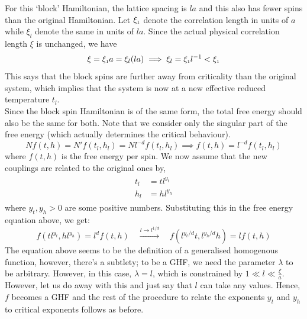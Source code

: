 For this `block' Hamiltonian, the lattice spacing is $la$ and this also has fewer spins than the original Hamiltonian. Let $\xi_{\text{\tiny 1}}$ denote the correlation length in units of $a$ while $\xi_l$ denote the same in units of $la$. Since the actual physical correlation length $\xi$ is unchanged, we have
\begin{align*}
    \xi = \xi_{\text{\tiny 1}}a = \xi_l (la) \implies \xi_l = \xi_{\text{\tiny 1}}l^{-1}< \xi_{\text{\tiny 1}}
\end{align*}
This says that the block spins are further away from criticality than the original system, which implies that the system is now at a new effective reduced temperature $t_l$. \\[0.2cm]
Since the block spin Hamiltonian is of the same form, the total free energy should also be the same for both. Note that we consider only the singular part of the free energy (which actually determines the critical behaviour).
\begin{equation}\label{joseph1}
    N f(t,h) = N' f(t_l,h_l) = N l^{-d}f(t_l,h_l) \implies f(t,h) = l^{-d}f(t_l,h_l)
\end{equation}
where $f(t,h)$ is the free energy per spin. We now assume that the new couplings are related to the original ones by,
\begin{align}
    \begin{split}
        t_l &= t l^{y_t}\\
        h_l &= h l^{y_h}
    \end{split}
\end{align}
where $y_t, y_h>0$ are some positive numbers. Substituting this in the free energy equation above, we get:
\begin{equation}
 f(t l^{y_t},h l^{y_h})=l^d f(t,h)\quad \xrightarrow{l\to l^{1/d}}  \quad f( l^{y_t/d}t, l^{y_h/d}h)=lf(t,h)
\end{equation}
The equation above seems to be the definition of a generalised homogenous function, however, there's a subtlety; to be a GHF, we need the parameter $\lambda$ to be arbitrary. However, in this case, $\lambda = l$, which is constrained by $1 \ll l \ll \frac{\xi}{a}$. However, let us do away with this and just say that $l$ can take any values. Hence, $f$ becomes a GHF and the rest of the procedure to relate the exponents $y_t$ and $y_h$ to critical exponents follows as before. 
